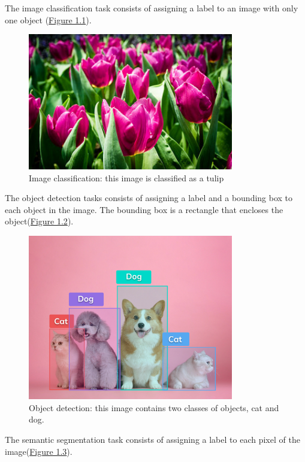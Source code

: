 The image classification task consists of assigning a label to an image with only one object (\hyperref[fig:figure-tulips]{Figure 1.1}).
\begin{figure}[H]
    \centering
    \includegraphics[width=0.8\textwidth]{images/1_1_tulips}
    \caption[Example of image classification]{Image classification: this image is classified as a tulip}
    \label{fig:figure-tulips}
\end{figure}
The object detection tasks consists of assigning a label and a bounding box to each object in the image.
The bounding box is a rectangle that encloses the object(\hyperref[fig:figure-object-detection]{Figure 1.2}).
\begin{figure}[H]
    \centering
    \includegraphics[width=0.8\textwidth]{images/1_1_object_detection}
    \caption[Example of object detection]{Object detection: this image contains two classes of objects, cat and dog.}
    \label{fig:figure-object-detection}
\end{figure}
The semantic segmentation task consists of assigning a label to each pixel of the image(\hyperref[fig:figure-semantic-segmentation]{Figure 1.3}).

